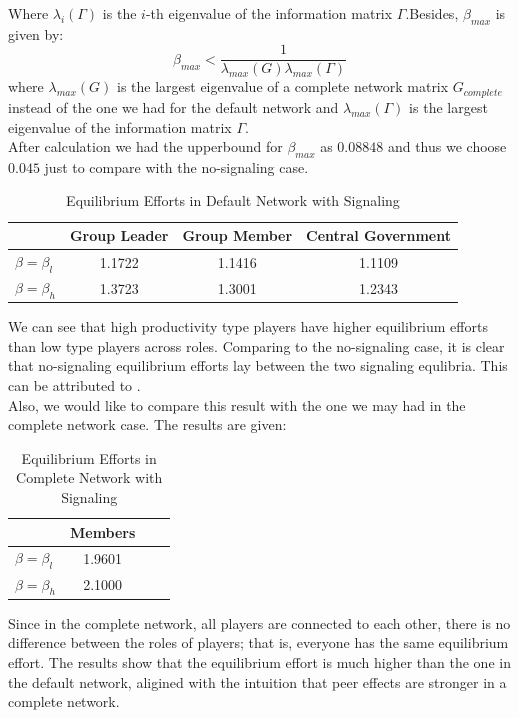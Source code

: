 \documentclass[12pt]{article}
\begin{document}
  Where $\lambda_i(\Gamma)$ is the $i$-th eigenvalue of the information matrix $\Gamma$.Besides, $\beta_{max}$ is given by:
\[
\beta_{max} < \frac{1}{\lambda_{max}(G)\lambda_{max}(\Gamma)}
\] 
  where $\lambda_{max}(G)$ is the largest eigenvalue of a complete network matrix $G_{complete}$ instead of the one we had for the default network  and $\lambda_{max}(\Gamma)$ is the largest eigenvalue of the information matrix $\Gamma$.\\
After calculation we had the upperbound for $\beta_{max}$ as $0.08848$ and thus we choose $0.045$ just to compare with the no-signaling case. \\
\begin{table}[H]
  \centering
  \caption{Equilibrium Efforts in Default Network with Signaling}
  \begin{tabular}{lccc}
  \toprule
   & \textbf{Group Leader} & \textbf{Group Member} & \textbf{Central Government} \\
  \midrule
  \(\beta = \beta_l\) & 1.1722 & 1.1416 & 1.1109 \\
  \(\beta = \beta_h\) & 1.3723 & 1.3001 & 1.2343 \\
  \bottomrule
  \end{tabular}
  \end{table}
  We can see that high productivity type players have higher equilibrium efforts than low type players across roles. Comparing to the no-signaling case, it is clear that no-signaling equilibrium efforts lay between the two signaling equlibria. This can be attributed to .\\
Also, we would like to compare this result with the one we may had in the complete network case. The results are given:
  \begin{table}[H]
    \centering
    \caption{Equilibrium Efforts in Complete Network with Signaling}
    \begin{tabular}{lccc}
    \toprule
     & \textbf{Members}\\
    \midrule
    \(\beta = \beta_l\) & 1.9601  \\
    \(\beta = \beta_h\) & 2.1000  \\
    \bottomrule
    \end{tabular}
    \end{table}
Since in the complete network, all players are connected to each other, there is no difference between the roles of players; that is, everyone has the same equilibrium effort. The results show that the equilibrium effort is much higher than the one in the default network, aligined with the intuition that peer effects are stronger in a complete network.\\
\end{document}
